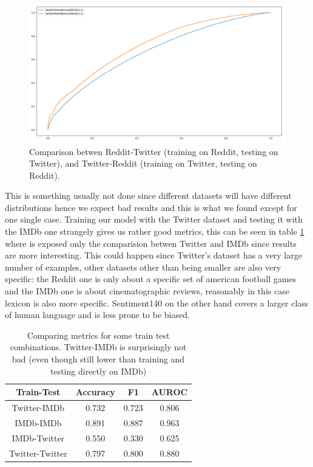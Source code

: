 \begin{figure}[h!t]
    \centering
    \includegraphics[scale=0.3]{../experiments/plots/RedditTwitter}
    \caption{Comparison betwen Reddit-Twitter (training on Reddit, testing on Twitter), and Twitter-Reddit (training on Twitter, testing on Reddit).}
    \label{fig:TwitterReddit}
\end{figure}

This is something usually not done since different datasets will have different distributions hence we expect bad results and this is what we found except for one single case.
Training our model with the Twitter dataset and testing it with the IMDb one strangely gives us rather good metrics, this can be seen in table \ref{tab:versus_metrics} where is exposed only the comparision betwen Twitter and IMDb since results are more interesting. 
This could happen since Twitter's dataset has a very large number of examples, other datasets other than being smaller are also very specific: the Reddit one is only about a specific set of american football games and the IMDb one is about cinematographic reviews, reasonably in this case lexicon is also more specific. 
Sentiment140 on the other hand covers a larger class of human language and is less prone to be biased.

\begin{table}[h!t]
    \centering
    \caption{Comparing metrics for some train test combinations. Twitter-IMDb is surprisingly not bad (even though still lower than training and testing directly on IMDb)}
    \label{tab:versus_metrics}
    \begin{tabular}{c|ccc}
        \hline
        Train-Test & Accuracy & F1 & AUROC \\
        \hline 
        Twitter-IMDb & 0.732 & 0.723 & 0.806 \\ 
        IMDb-IMDb & 0.891 & 0.887 & 0.963 \\ 
        IMDb-Twitter & 0.550 & 0.330 & 0.625 \\ 
        Twitter-Twitter & 0.797 & 0.800 & 0.880 \\ 
        \hline
    \end{tabular}
\end{table}
